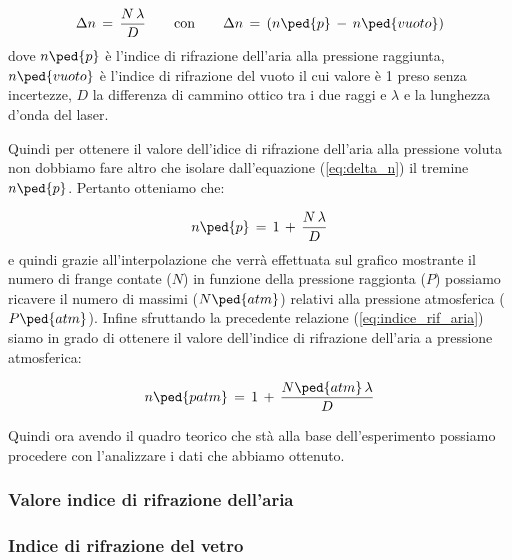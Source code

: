 \begin{equation}
	\Delta{n} \,=\, \frac{N \, \lambda}{D} \qquad \text{con} \qquad \Delta{n} \,=\, (n\ped{p} \,-\, n\ped{vuoto})
	\label{eq:delta_n}
\end{equation}
%
dove $n\ped{p}$ è l'indice di rifrazione dell'aria alla pressione raggiunta, $n\ped{vuoto}$ è l'indice di rifrazione del vuoto il cui valore è 1 preso senza incertezze, $D$ la differenza di cammino ottico tra i due raggi e $\lambda$ e la lunghezza d'onda del laser.

Quindi per ottenere il valore dell'idice di rifrazione dell'aria alla pressione voluta non dobbiamo fare altro che isolare dall'equazione (\ref{eq:delta_n}) il tremine $n\ped{p}$. Pertanto otteniamo che:

\begin{equation}
	n\ped{p} \,=\, 1 \,+\, \frac{N \, \lambda}{D}
	\label{eq:indice_rif_aria}
\end{equation}
%
e quindi grazie all'interpolazione che verrà effettuata sul grafico mostrante il numero di frange contate ($N$) in funzione della pressione raggionta ($P$) possiamo ricavere il numero di massimi ($N\ped{atm}$) relativi alla pressione atmosferica ($P\ped{atm}$). Infine sfruttando la precedente relazione (\ref{eq:indice_rif_aria}) siamo in grado di ottenere il valore dell'indice di rifrazione dell'aria a pressione atmosferica:

\begin{equation}
	n\ped{patm} \,=\, 1 \,+\, \frac{N\ped{atm} \, \lambda}{D}
	\label{eq:indice_rif_aria_atm}
\end{equation}
%

Quindi ora avendo il quadro teorico che stà alla base dell'esperimento possiamo procedere con l'analizzare i dati che abbiamo ottenuto.

\subsubsection{Valore indice di rifrazione dell'aria}

\subsubsection{Indice di rifrazione del vetro}
